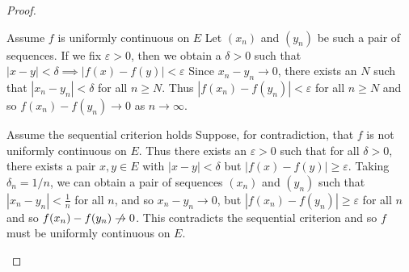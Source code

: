 \documentclass[../main.tex]{subfiles}
\begin{document}
\begin{proof}
  \begin{proofdirection}{Assume $f$ is uniformly continuous on $E$}
    Let $(x_n)$ and $(y_n)$ be such a pair of sequences.
    If we fix $\varepsilon > 0$, then we obtain a $\delta > 0$ such that $|x - y| < \delta \implies |f(x) - f(y)| < \varepsilon$
    Since $x_n - y_n \to 0$, there exists an $N$ such that $|x_n - y_n| < \delta$ for all $n \geq N$.
    Thus $|f(x_n) - f(y_n)| < \varepsilon$ for all $n \geq N$ and so $f(x_n) - f(y_n) \to 0$ as $n \to \infty$.
  \end{proofdirection}
  \begin{proofdirection}{Assume the sequential criterion holds}
    Suppose, for contradiction, that $f$ is not uniformly continuous on $E$.
    Thus there exists an $\varepsilon > 0$ such that for all $\delta > 0$, there exists a pair $x, y \in E$ with $|x - y| < \delta$ but $|f(x) - f(y)| \geq \varepsilon$.
    Taking $\delta_n = 1/n$, we can obtain a pair of sequences $(x_n)$ and $(y_n)$ such that $|x_n - y_n| < \frac{1}{n}$ for all $n$, and so $x_n - y_n \to 0$, but $|f(x_n) - f(y_n)| \geq \varepsilon$ for all $n$ and so $f(x_n) - f(y_n) \centernot\to 0$.
    This contradicts the sequential criterion and so $f$ must be uniformly continuous on $E$.
  \end{proofdirection}
\end{proof}
\end{document}
